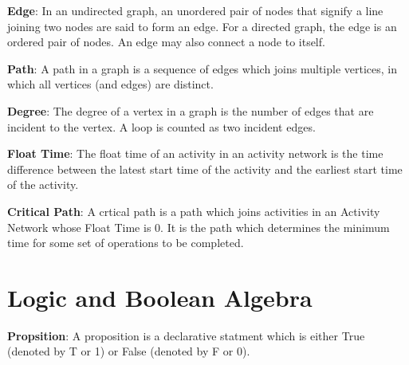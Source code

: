 \begin{defn}\label{mod1:defn:Edge}
   \textbf{Edge}: In an undirected graph, an unordered pair of nodes that signify  a line joining  two nodes are said to form an edge. For a directed graph, the edge is an ordered pair of nodes. An edge may also connect a node to itself.
\end{defn}

\begin{defn}\label{mod1:defn:Path}
    \textbf{Path}: A path in a graph is a sequence of edges which joins multiple vertices, in which all vertices (and edges) are distinct.
\end{defn}

\begin{defn}\label{mod1:defn:Degree}
   \textbf{Degree}: The degree of a vertex  in a graph is the number of edges that are incident to the vertex. A loop is counted as two incident edges.
\end{defn}

\begin{defn}\label{mod1:defn:FloatTime}
	\textbf{Float Time}: The float time of an activity in an activity network is the time difference between the latest start time of the activity and the earliest start time of the activity.
\end{defn}

\begin{defn}\label{mod1:defn:CritPath}
	\textbf{Critical Path}: A crtical path is a path which joins activities in an Activity Network whose Float Time is $0$. It is the path which determines the minimum time for some set of operations to be completed. 
\end{defn}
	

\section{Logic and Boolean Algebra}

\begin{defn}\label{mod1:defn:Proposition}
   \textbf{Propsition}: A proposition is a declarative statment which is either True (denoted by T or 1) or False (denoted by F or 0).
\end{defn}


